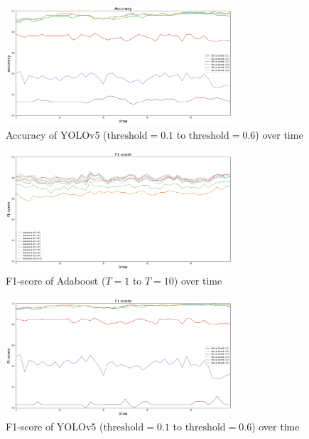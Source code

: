 \documentclass{article}[12pt]
\begin{document}
\begin{figure}[H]
    \centering
    \includegraphics[width=0.75\textwidth]{figure/Accuracy_yolo.png}
    \caption{Accuracy of YOLOv5 ($\text{threshold}=0.1$ 
    to $\text{threshold}=0.6$) over time}
    \label{fig:acc_yolo}
\end{figure}

\begin{figure}[H]
    \centering
    \includegraphics[width=0.75\textwidth]{figure/F1-score_Adaboost.png}
    \caption{F1-score of Adaboost ($T=1$ to $T=10$) over time}
    \label{fig:f1_ada}
\end{figure}

\begin{figure}[H]
    \centering
    \includegraphics[width=0.75\textwidth]{figure/F1-score_yolo.png}
    \caption{F1-score of YOLOv5 ($\text{threshold}=0.1$ 
    to $\text{threshold}=0.6$) over time}
    \label{fig:f1_yolo}
\end{figure}
\end{document}
